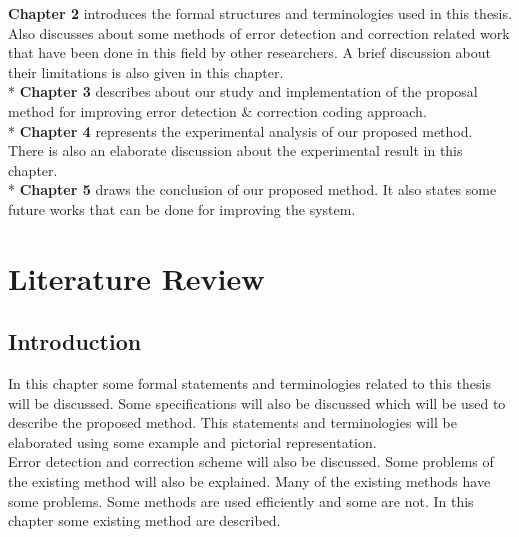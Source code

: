 \documentclass[12pt,a4paper]{report}
\begin{document}
 \textbf{Chapter 2} introduces the formal structures and terminologies used in this thesis. Also discusses about some methods of error detection and correction related work that have been done in this field by other researchers. A brief discussion about their limitations is also given in this chapter.\\*
 \textbf{Chapter 3} describes about our study and implementation of the proposal method for improving error detection \& correction coding approach.\\*
 \textbf{Chapter 4} represents the experimental analysis of our proposed method. There is also an elaborate discussion about the experimental result in this chapter.\\*
 \textbf{Chapter 5} draws the conclusion of our proposed method. It also states some future works that can be done for improving the system.
 
 \chapter{Literature Review}
 
 \section{Introduction}
 In this chapter some formal statements and terminologies related to this thesis will be discussed. Some specifications will also be discussed which will be used to describe the proposed method. This statements and terminologies will be elaborated using some example and pictorial representation.\\
 
 Error detection and correction scheme will also be discussed. Some problems of the existing method will also be explained. Many of the existing methods have some problems. Some methods are used efficiently and some are not. In this chapter some existing method are described.
 
\end{document}
